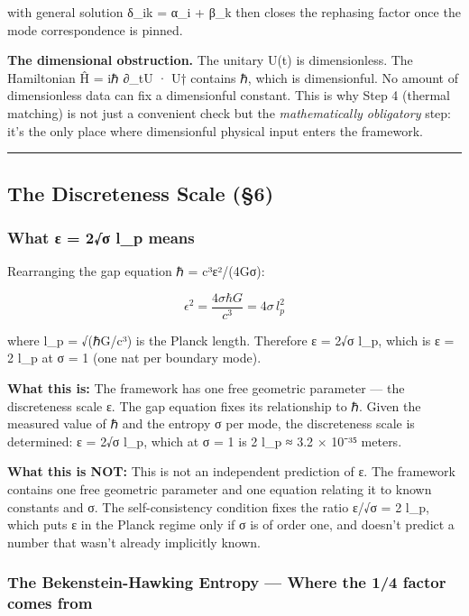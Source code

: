 \documentclass[
]{article}
\begin{document}
with general solution δ\_ik = α\_i + β\_k then closes the rephasing
factor once the mode correspondence is pinned.

\textbf{The dimensional obstruction.} The unitary U(t) is dimensionless.
The Hamiltonian Ĥ = iℏ ∂\_tU · U† contains ℏ, which is dimensionful. No
amount of dimensionless data can fix a dimensionful constant. This is
why Step 4 (thermal matching) is not just a convenient check but the
\emph{mathematically obligatory} step: it's the only place where
dimensionful physical input enters the framework.

\begin{center}\rule{0.5\linewidth}{0.5pt}\end{center}

\hypertarget{the-discreteness-scale-6}{%
\subsection{The Discreteness Scale
(§6)}\label{the-discreteness-scale-6}}

\hypertarget{what-ux3b5-2ux3c3-l_p-means}{%
\subsubsection{What ε = 2√σ l\_p
means}\label{what-ux3b5-2ux3c3-l_p-means}}

Rearranging the gap equation ℏ = c³ε²/(4Gσ):

\[\epsilon^2 = \frac{4\sigma\hbar G}{c^3} = 4\sigma \, l_p^2\]

where l\_p = √(ℏG/c³) is the Planck length. Therefore ε = 2√σ l\_p,
which is ε = 2 l\_p at σ = 1 (one nat per boundary mode).

\textbf{What this is:} The framework has one free geometric parameter
--- the discreteness scale ε. The gap equation fixes its relationship to
ℏ. Given the measured value of ℏ and the entropy σ per mode, the
discreteness scale is determined: ε = 2√σ l\_p, which at σ = 1 is 2 l\_p
≈ 3.2 × 10⁻³⁵ meters.

\textbf{What this is NOT:} This is not an independent prediction of ε.
The framework contains one free geometric parameter and one equation
relating it to known constants and σ. The self-consistency condition
fixes the ratio ε/√σ = 2 l\_p, which puts ε in the Planck regime only if
σ is of order one, and doesn't predict a number that wasn't already
implicitly known.

\hypertarget{the-bekenstein-hawking-entropy-where-the-14-factor-comes-from}{%
\subsubsection{The Bekenstein-Hawking Entropy --- Where the 1/4 factor
comes
from}\label{the-bekenstein-hawking-entropy-where-the-14-factor-comes-from}}
\end{document}
